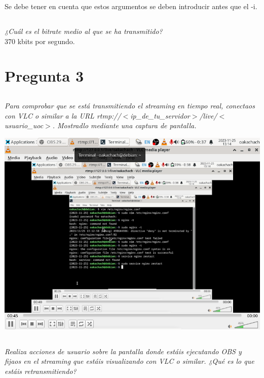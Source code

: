 \documentclass[spanish]{article}
\begin{document}
Se debe tener en cuenta que estos argumentos se deben
introducir antes que el -i.

\subsection{}

\textit{¿Cuál es el bitrate medio al que se ha
transmitido?}\\

370 kbits por segundo.

\section{Pregunta 3}

\subsection{}

\textit{Para comprobar que se está transmitiendo el
streaming en tiempo real, conectaos con VLC o similar a la
URL
rtmp://\(<\)ip\_de\_tu\_servidor\(>\)/live/\(<\)usuario\_uoc\(>\).
Mostradlo mediante una captura de pantalla.}

\begin{center}
\includegraphics[scale=0.45]{../img/6.png}
\end{center}

\subsection{}

\textit{Realiza acciones de usuario sobre la pantalla donde
estáis ejecutando OBS y fijaos en el streaming que estáis
visualizando con VLC o similar. ¿Qué es lo que estáis
retransmitiendo?}\\
\end{document}
